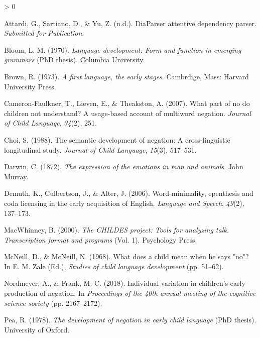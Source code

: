\documentclass[
  english,
  man,floatsintext]{apa6}
\newlength{\cslhangindent}
\newenvironment{CSLReferences}[2] %
 {%
  \setlength{\parindent}{0pt}
  \ifodd #1 \everypar{\setlength{\hangindent}{\cslhangindent}}\ignorespaces\fi
  \ifnum #2 > 0
  \setlength{\parskip}{#2\baselineskip}
  \fi
 }%
 {}
\begin{document}
\hypertarget{refs}{}
\begin{CSLReferences}{1}{0}
\leavevmode\hypertarget{ref-diaparser}{}%
Attardi, G., Sartiano, D., \& Yu, Z. (n.d.). DiaParser attentive dependency parser. \emph{Submitted for Publication}.

\leavevmode\hypertarget{ref-bloom1970language}{}%
Bloom, L. M. (1970). \emph{Language development: Form and function in emerging grammars} (PhD thesis). Columbia University.

\leavevmode\hypertarget{ref-Brown1973}{}%
Brown, R. (1973). \emph{A first language, the early stages}. Cambrdige, Mass: Harvard University Press.

\leavevmode\hypertarget{ref-cameron2007part}{}%
Cameron-Faulkner, T., Lieven, E., \& Theakston, A. (2007). What part of no do children not understand? A usage-based account of multiword negation. \emph{Journal of Child Language}, \emph{34}(2), 251.

\leavevmode\hypertarget{ref-choi1988semantic}{}%
Choi, S. (1988). The semantic development of negation: A cross-linguistic longitudinal study. \emph{Journal of Child Language}, \emph{15}(3), 517--531.

\leavevmode\hypertarget{ref-darwin1872expression}{}%
Darwin, C. (1872). \emph{The expression of the emotions in man and animals}. John Murray.

\leavevmode\hypertarget{ref-demuth2006word}{}%
Demuth, K., Culbertson, J., \& Alter, J. (2006). Word-minimality, epenthesis and coda licensing in the early acquisition of {E}nglish. \emph{Language and Speech}, \emph{49}(2), 137--173.

\leavevmode\hypertarget{ref-macwhinney2000childes}{}%
MacWhinney, B. (2000). \emph{The CHILDES project: Tools for analyzing talk. Transcription format and programs} (Vol. 1). Psychology Press.

\leavevmode\hypertarget{ref-mcneill1968}{}%
McNeill, D., \& McNeill, N. (1968). What does a child mean when he says "no"? In E. M. Zale (Ed.), \emph{Studies of child language development} (pp. 51--62).

\leavevmode\hypertarget{ref-nordmeyer2018individual}{}%
Nordmeyer, A., \& Frank, M. C. (2018). Individual variation in children's early production of negation. In \emph{Proceedings of the 40th annual meeting of the cognitive science society} (pp. 2167--2172).

\leavevmode\hypertarget{ref-pea1978}{}%
Pea, R. (1978). \emph{The development of negation in early child language} (PhD thesis). University of Oxford.


\end{CSLReferences}
\end{document}
